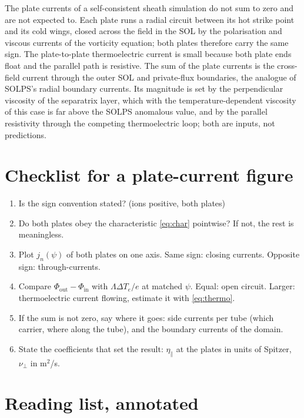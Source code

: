 \documentclass[11pt,a4paper]{article}
\newcommand{\Te}{T_e}
\begin{document}
\begin{tcolorbox}[key={Key: what to say}]
The plate currents of a self-consistent sheath simulation do not sum to zero and are not expected to. Each plate runs
a radial circuit between its hot strike point and its cold wings, closed across the field in the SOL by the
polarisation and viscous currents of the vorticity equation; both plates therefore carry the same sign. The
plate-to-plate thermoelectric current is small because both plate ends float and the parallel path is resistive. The
sum of the plate currents is the cross-field current through the outer SOL and private-flux boundaries, the analogue
of SOLPS's radial boundary currents. Its magnitude is set by the perpendicular viscosity of the separatrix layer,
which with the temperature-dependent viscosity of this case is far above the SOLPS anomalous value, and by the
parallel resistivity through the competing thermoelectric loop; both are inputs, not predictions.
\end{tcolorbox}

\section{Checklist for a plate-current figure}

\begin{enumerate}
\item Is the sign convention stated? (ions positive, both plates)
\item Do both plates obey the characteristic \eqref{eq:char} pointwise? If not, the rest is meaningless.
\item Plot $j_n(\psi)$ of both plates on one axis. Same sign: closing currents. Opposite sign: through-currents.
\item Compare $\Phi_{\mathrm{out}}-\Phi_{\mathrm{in}}$ with $\Lambda\Delta\Te/e$ at matched $\psi$. Equal: open circuit.
      Larger: thermoelectric current flowing, estimate it with \eqref{eq:thermo}.
\item If the sum is not zero, say where it goes: side currents per tube (which carrier, where along the tube), and the
      boundary currents of the domain.
\item State the coefficients that set the result: $\eta_\parallel$ at the plates in units of Spitzer, $\nu_\perp$ in m$^2$/s.
\end{enumerate}

\appendix
\section{Reading list, annotated}
\end{document}
